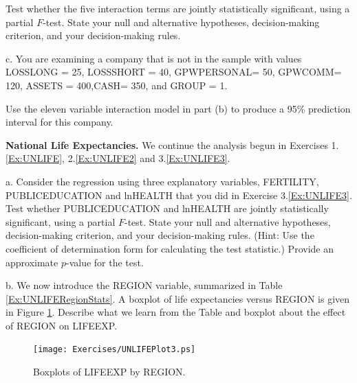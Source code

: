 \begin{exercises}
Test whether the five interaction terms are jointly statistically
significant, using a partial $F$-test. State your null and
alternative hypotheses, decision-making criterion, and your
decision-making rules.

c. You are examining a company that is not in the sample with values
LOSSLONG = 25, LOSSSHORT = 40, GPWPERSONAL= 50, GPWCOMM= 120, ASSETS
= 400,CASH= 350, and GROUP = 1.

Use the eleven variable interaction model in part (b) to produce a
95\% prediction interval for this company.


\item \textbf{National Life Expectancies.}\label{Ex:UNLIFE4} We
continue the analysis begun in Exercises 1.\ref{Ex:UNLIFE},
2.\ref{Ex:UNLIFE2} and 3.\ref{Ex:UNLIFE3}.

a. Consider the regression using three explanatory variables,
FERTILITY, PUBLICEDUCATION and lnHEALTH that you did in Exercise
3.\ref{Ex:UNLIFE3}. Test whether PUBLICEDUCATION and lnHEALTH are
jointly statistically significant, using a partial $F$-test. State
your null and alternative hypotheses, decision-making criterion, and
your decision-making rules. (Hint: Use the coefficient of
determination form for calculating the test statistic.) Provide an
approximate $p$-value for the test.

b. We now introduce the REGION variable, summarized in Table
\ref{Ex:UNLIFERegionStats}. A boxplot of life expectancies versus
REGION is given in Figure \ref{Ex:UNLIFEPlot3}. Describe what we
learn from the Table and boxplot about the effect of REGION on
LIFEEXP.


\begin{figure}[htp]
  \begin{center}
   \texttt{[image: Exercises/UNLIFEPlot3.ps]}
   \caption{\label{Ex:UNLIFEPlot3} \small  Boxplots of LIFEEXP by REGION.}
  \end{center}
\end{figure}


\begin{table}[h]


\end{table}
\end{exercises}
